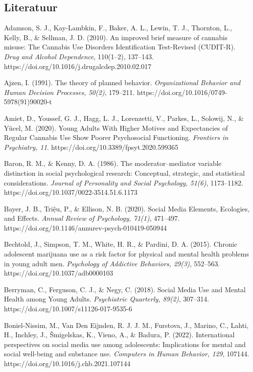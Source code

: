 \documentclass[
  letterpaper,
  DIV=11,
  numbers=noendperiod]{scrartcl}
\begin{document}
\hypertarget{literatuur}{%
\subsection{Literatuur}\label{literatuur}}

Adamson, S. J., Kay-Lambkin, F., Baker, A. L., Lewin, T. J., Thornton,
L., Kelly, B., \& Sellman, J. D. (2010). An improved brief measure of
cannabis misuse: The Cannabis Use Disorders Identification Test-Revised
(CUDIT-R). \emph{Drug and Alcohol Dependence}, 110(1--2), 137--143.
https://doi.org/10.1016/j.drugalcdep.2010.02.017

Ajzen, I. (1991). The theory of planned behavior. \emph{Organizational
Behavior and Human Decision Processes, 50(2)}, 179--211.
https://doi.org/10.1016/0749-5978(91)90020-t

Amiet, D., Youssef, G. J., Hagg, L. J., Lorenzetti, V., Parkes, L.,
Solowij, N., \& Yücel, M. (2020). Young Adults With Higher Motives and
Expectancies of Regular Cannabis Use Show Poorer Psychosocial
Functioning. \emph{Frontiers in Psychiatry, 11}.
https://doi.org/10.3389/fpsyt.2020.599365

Baron, R. M., \& Kenny, D. A. (1986). The moderator--mediator variable
distinction in social psychological research: Conceptual, strategic, and
statistical considerations. \emph{Journal of Personality and Social
Psychology, 51(6)}, 1173--1182.
https://doi.org/10.1037/0022-3514.51.6.1173

Bayer, J. B., Triệu, P., \& Ellison, N. B. (2020). Social Media
Elements, Ecologies, and Effects. \emph{Annual Review of Psychology,
71(1)}, 471--497. https://doi.org/10.1146/annurev-psych-010419-050944

Bechtold, J., Simpson, T. M., White, H. R., \& Pardini, D. A. (2015).
Chronic adolescent marijuana use as a risk factor for physical and
mental health problems in young adult men. \emph{Psychology of Addictive
Behaviors, 29(3)}, 552--563. https://doi.org/10.1037/adb0000103

Berryman, C., Ferguson, C. J., \& Negy, C. (2018). Social Media Use and
Mental Health among Young Adults. \emph{Psychiatric Quarterly, 89(2)},
307--314. https://doi.org/10.1007/s11126-017-9535-6

Boniel-Nissim, M., Van Den Eijnden, R. J. J. M., Furstova, J., Marino,
C., Lahti, H., Inchley, J., Šmigelskas, K., Vieno, A., \& Badura, P.
(2022). International perspectives on social media use among
adolescents: Implications for mental and social well-being and substance
use. \emph{Computers in Human Behavior, 129}, 107144.
https://doi.org/10.1016/j.chb.2021.107144
\end{document}
